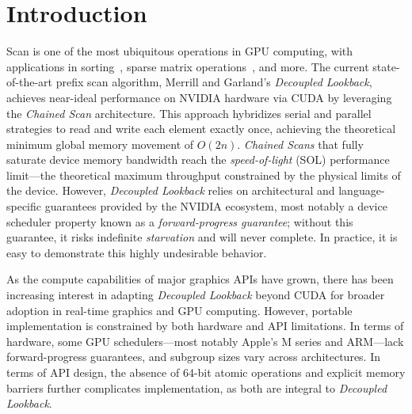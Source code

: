 \documentclass[acmsmall, manuscript, screen, review, anonymous]{acmart}
\begin{document}



\maketitle

\section{Introduction}
Scan is one of the most ubiquitous operations in GPU computing, with applications in sorting~\cite{adinets2022onesweepfastersignificantdigit}, sparse matrix operations~\cite{BellGarland2009}, and more. The current state-of-the-art prefix scan algorithm, Merrill and Garland's \emph{Decoupled Lookback}, achieves near-ideal performance on NVIDIA hardware via CUDA by leveraging the \emph{Chained Scan} architecture. This approach hybridizes serial and parallel strategies to read and write each element exactly once, achieving the theoretical minimum global memory movement of $O(2n)$. \emph{Chained Scans} that fully saturate device memory bandwidth reach the \emph{speed-of-light} (SOL) performance limit---the theoretical maximum throughput constrained by the physical limits of the device. However, \emph{Decoupled Lookback} relies on architectural and language-specific guarantees provided by the NVIDIA ecosystem, most notably a device scheduler property known as a \emph{forward-progress guarantee}; without this guarantee, it risks indefinite \emph{starvation} and will never complete. In practice, it is easy to demonstrate this highly undesirable behavior.

As the compute capabilities of major graphics APIs have grown, there has been increasing interest in adapting \emph{Decoupled Lookback} beyond CUDA for broader adoption in real-time graphics and GPU computing. However, portable implementation is constrained by both hardware and API limitations. In terms of hardware, some GPU schedulers---most notably Apple's M series and ARM---lack forward-progress guarantees, and subgroup sizes vary across architectures. In terms of API design, the absence of 64-bit atomic operations and explicit memory barriers further complicates implementation, as both are integral to \emph{Decoupled Lookback}.
\end{document}
